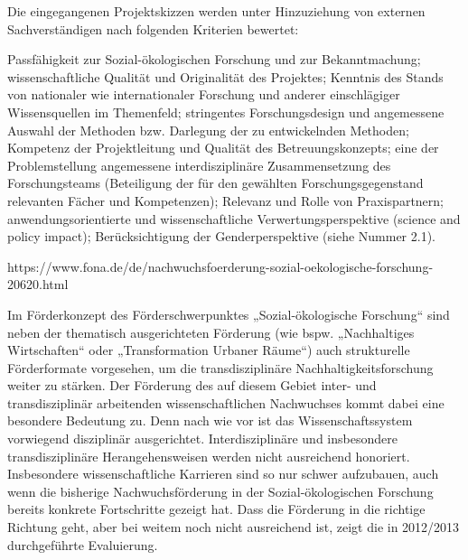 Die eingegangenen Projektskizzen werden unter Hinzuziehung von externen Sachverständigen nach folgenden Kriterien bewertet:

    Passfähigkeit zur Sozial-ökologischen Forschung und zur Bekanntmachung;
    wissenschaftliche Qualität und Originalität des Projektes;
    Kenntnis des Stands von nationaler wie internationaler Forschung und anderer einschlägiger Wissensquellen im Themenfeld;
    stringentes Forschungsdesign und angemessene Auswahl der Methoden bzw. Darlegung der zu entwickelnden Methoden;
    Kompetenz der Projektleitung und Qualität des Betreuungskonzepts;
    eine der Problemstellung angemessene interdisziplinäre Zusammensetzung des Forschungsteams (Beteiligung der für den gewählten Forschungsgegenstand relevanten Fächer und Kompetenzen);
    Relevanz und Rolle von Praxispartnern;
    anwendungsorientierte und wissenschaftliche Verwertungsperspektive (science and policy impact);
    Berücksichtigung der Genderperspektive (siehe Nummer 2.1).
    
    
   https://www.fona.de/de/nachwuchsfoerderung-sozial-oekologische-forschung-20620.html 
    
    Im Förderkonzept des Förderschwerpunktes „Sozial-ökologische Forschung“ sind neben der thematisch ausgerichteten Förderung (wie bspw. „Nachhaltiges Wirtschaften“ oder „Transformation Urbaner Räume“) auch strukturelle Förderformate vorgesehen, um die transdisziplinäre Nachhaltigkeitsforschung weiter zu stärken. Der Förderung des auf diesem Gebiet inter- und transdisziplinär arbeitenden wissenschaftlichen Nachwuchses kommt dabei eine besondere Bedeutung zu. Denn nach wie vor ist das Wissenschaftssystem vorwiegend disziplinär ausgerichtet. Interdisziplinäre und insbesondere transdisziplinäre Herangehensweisen werden nicht ausreichend honoriert. Insbesondere wissenschaftliche Karrieren sind so nur schwer aufzubauen, auch wenn die bisherige Nachwuchsförderung in der Sozial-ökologischen Forschung bereits konkrete Fortschritte gezeigt hat. Dass die Förderung in die richtige Richtung geht, aber bei weitem noch nicht ausreichend ist, zeigt die in 2012/2013 durchgeführte Evaluierung.


